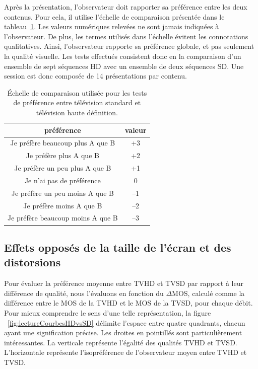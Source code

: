 Après la présentation, l'observateur doit rapporter sa préférence entre les deux contenus. Pour cela, il utilise l'échelle de comparaison présentée dans le tableau~\ref{tab:compscale}. Les valeurs numériques relevées ne sont jamais indiquées à l'observateur. De plus, les termes utilisés dans l'échelle évitent les connotations qualitatives. Ainsi, l'observateur rapporte sa préférence globale, et pas seulement la qualité visuelle. Les tests effectués consistent donc en la comparaison d'un ensemble de sept séquences HD avec un ensemble de deux séquences SD. Une session est donc composée de 14 présentations par contenu. %

\begin{table}[htbp]
\centering
\begin{tabular}{cc}\toprule
\textbf{préférence} & \textbf{valeur} \\ \toprule
Je préfère beaucoup plus A que B & +3 \\ \midrule
Je préfère plus A que B & +2 \\ \midrule
Je préfère un peu plus A que B & +1 \\ \midrule
Je n'ai pas de préférence & 0 \\ \midrule
Je préfère un peu moins A que B & --1 \\ \midrule
Je préfère moins A que B & --2 \\ \midrule
Je préfère beaucoup moins A que B & --3 \\ \bottomrule
\end{tabular}
\caption{Échelle de comparaison utilisée pour les tests de préférence entre télévision standard et télévision haute définition.}
\label{tab:compscale}
\end{table}


\subsection{Effets opposés de la taille de l'écran et des distorsions}
Pour évaluer la préférence moyenne entre TVHD et TVSD par rapport à leur différence de qualité, nous l'évaluons en fonction du $\Delta$MOS, calculé comme la différence entre le MOS de la TVHD et le MOS de la TVSD, pour chaque débit. Pour mieux comprendre le sens d'une telle représentation, la figure ~\ref{fig:lectureCourbesHDvsSD} délimite l'espace entre quatre quadrants, chacun ayant une signification précise. Les droites en pointillés sont particulièrement intéressantes. La verticale représente l'égalité des qualités TVHD et TVSD. L'horizontale représente l'isopréférence de l'observateur moyen entre TVHD et TVSD.

